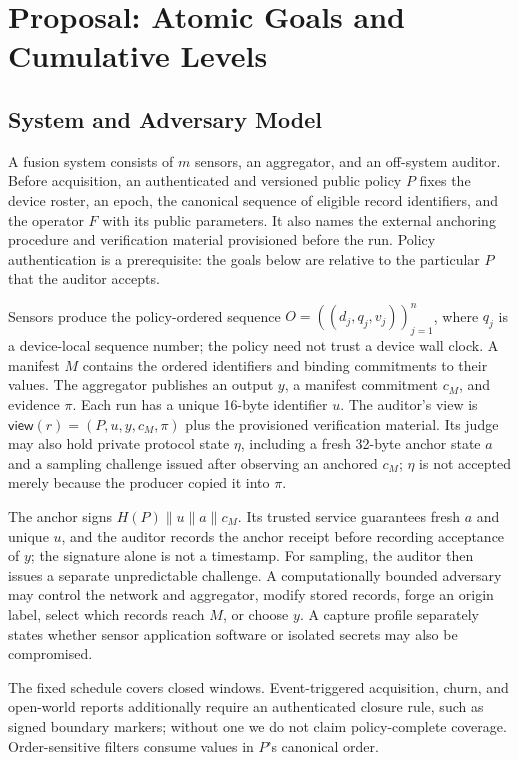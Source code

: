\section{Proposal: Atomic Goals and Cumulative Levels}
\label{sec:proposal}

\subsection{System and Adversary Model}
\label{sec:model}

A fusion system consists of $m$ sensors, an aggregator, and an off-system
auditor. Before acquisition, an authenticated and versioned public policy $P$
fixes the device roster, an epoch, the canonical sequence of eligible record
identifiers, and the operator $F$ with its public parameters. It also names the
external anchoring procedure and verification material provisioned before the
run. Policy authentication is a prerequisite: the goals below are relative to
the particular $P$ that the auditor accepts.

Sensors produce the policy-ordered sequence
$O=((d_j,q_j,v_j))_{j=1}^{n}$, where $q_j$ is a device-local sequence number;
the policy need not trust a device wall clock. A manifest $M$ contains the
ordered identifiers and binding commitments to their values. The aggregator
publishes an output $y$, a manifest commitment $c_M$, and evidence $\pi$.
Each run has a unique 16-byte identifier $u$. The auditor's view is
$\mathsf{view}(r)=(P,u,y,c_M,\pi)$ plus the provisioned
verification material. Its judge may also hold private protocol state $\eta$,
including a fresh 32-byte anchor state $a$ and a sampling challenge issued
after observing an anchored $c_M$; $\eta$ is not accepted merely because the
producer copied it into $\pi$.

The anchor signs $H(P)\|u\|a\|c_M$. Its trusted service guarantees fresh $a$
and unique $u$, and the auditor records the anchor receipt before recording
acceptance of $y$; the signature alone is not a timestamp. For sampling, the
auditor then issues a separate unpredictable challenge. A computationally
bounded adversary may control the network
and aggregator, modify stored records, forge an origin label, select which
records reach $M$, or choose $y$. A capture profile separately states whether
sensor application software or isolated secrets may also be compromised.

The fixed schedule covers closed windows. Event-triggered acquisition, churn,
and open-world reports additionally require an authenticated closure rule, such
as signed boundary markers; without one we do not claim policy-complete
coverage. Order-sensitive filters consume values in $P$'s canonical order.

